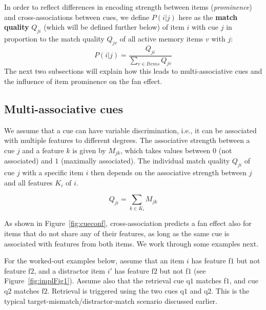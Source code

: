 \documentclass{cambridge7A}\usepackage[]{graphicx}\usepackage[]{color}
\begin{document}
In order to reflect differences in encoding strength between items (\emph{prominence}) and cross-associations between cues, we define $P(i|j)$ here as the \textbf{match quality} $Q_{ji}$ (which will be defined further below) of item $i$ with cue $j$ in proportion to the match quality $Q_{jv}$ of all active memory items $v$ with $j$:
% 
\begin{equation} \label{eq:newfan}
	P(i|j) = \frac{Q_{ji}}{\sum\limits_{v \in Items} Q_{jv}}
\end{equation}
%
The next two subsections will explain how this leads to multi-associative cues and the influence of item prominence on the fan effect.


\subsection{Multi-associative cues}
We assume that a cue can have variable discrimination, i.e., it can be associated with multiple features to different degrees. The associative strength between a cue $j$ and a feature $k$ is given by $M_{jk}$, which takes values between $0$ (not associated) and $1$ (maximally associated). 
The individual match quality $Q_{ji}$ of cue $j$ with a specific item $i$ then depends on the associative strength between $j$ and all features $K_i$ of $i$. 

\begin{equation}
    Q_{ji} = \sum_{k \in K_i} M_{jk} \label{eq:Qji}
\end{equation}

As shown in Figure~\ref{fig:cueconf}, cross-association predicts a fan effect also for items that do not share any of their features, as long as the same cue is associated with features from both items. We work through some examples next.

For the worked-out examples below, assume that an item $i$ has feature f$1$ but not feature f$2$, and a distractor item $i'$ has feature f$2$ but not f$1$ (see Figure~\ref{fig:implFig1}). Assume also that the retrieval cue q$1$ matches f$1$, and cue q$2$ matches f$2$. Retrieval is triggered using the two cues q$1$ and q$2$. This is the typical target-mismatch/distractor-match scenario discussed earlier.
\end{document}
